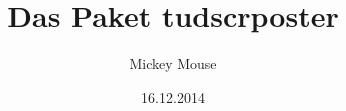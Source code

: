 \documentclass[%
  english,ngerman,
  cdgeometry=no,
]%
{tudscrreprtnew}
\begin{document}
\Blindtext
\pagestyle{tudheadings}
\Blindtext
\Blindtext
{}
\Blindtext

\date{16.12.2014}
\author{Mickey Mouse}
\title{Das Paket tudscrposter}
\maketitle

\Blindtext
\end{document}
